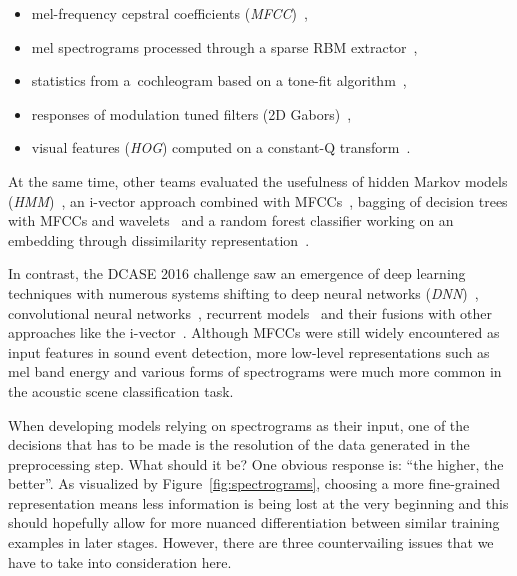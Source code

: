 \documentclass{article}
\begin{document}
\begin{sloppy}
\begin{itemize}[noitemsep,topsep=0pt,leftmargin=12pt,partopsep=4pt]
\itemsep0em

\item mel-frequency cepstral coefficients (\textit{MFCC})~\cite{geiger2013, nogueira2013, roma2013},
\item mel spectrograms processed through a sparse RBM extractor~\cite{nam2013},
\item statistics from a~cochleogram based on a tone-fit algorithm~\cite{krijnders2013},
\item responses of modulation tuned filters (2D Gabors)~\cite{patil2013},
\item visual features (\textit{HOG}) computed on a constant-Q transform~\cite{rakotomamonjy2015}.

\end{itemize}

\noindent At the same time, other teams evaluated the usefulness of hidden Markov models (\textit{HMM})~\cite{chum2013}, an i-vector approach combined with MFCCs~\cite{elizalde2013}, bagging of decision trees with MFCCs and wavelets~\cite{li2013} and a random forest classifier working on an embedding through dissimilarity representation~\cite{olivetti2013}.

In contrast, the DCASE 2016 challenge saw an emergence of deep learning techniques with numerous systems shifting to deep neural networks (\textit{DNN})~\cite{mun2016, takahashi2016, xu2016, choi2016}, convolutional neural networks~\cite{han2016, valenti2016, lidy2016, phan2016, battaglino2016, cakir2016}, recurrent models~\cite{vu2016, bae2016, zoehrer2016, hayashi2016, adavanne2016} and their fusions with other approaches like the i-vector~\cite{eghbal2016}. Although MFCCs were still widely encountered as input features in sound event detection, more low-level representations such as mel band energy and various forms of spectrograms were much more common in the acoustic scene classification task.

When developing models relying on spectrograms as their input, one of the decisions that has to be made is the resolution of the data generated in the preprocessing step. What should it be? One obvious response is: \enquote{the higher, the better}. As visualized by Figure~\ref{fig:spectrograms}, choosing a more fine-grained representation means less information is being lost at the very beginning and this should hopefully allow for more nuanced differentiation between similar training examples in later stages. However, there are three countervailing issues that we have to take into consideration here.


\end{sloppy}
\end{document}
